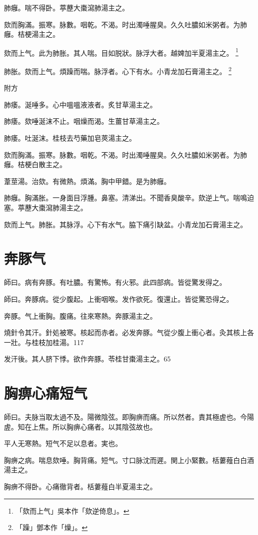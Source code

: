 \documentclass[12pt,twoside,UTF8,b5paper]{ctexbook}
\begin{document}
肺癰。喘不得卧。葶藶大棗瀉肺湯主之。

欬而胸滿。振寒。脉數。咽乾。不渴。时出濁唾腥臭。久久吐膿如米粥者。为肺癰。桔梗湯主之。

欬而上气。此为肺胀。其人喘。目如脱狀。脉浮大者。越婢加半夏湯主之。
	\footnote{「欬而上气」吳本作「欬逆倚息」。}

肺胀。欬而上气。煩躁而喘。脉浮者。心下有水。小青龙加石膏湯主之。
	\footnote{「躁」鄧本作「燥」。}

附方

肺痿。涎唾多。心中嗢嗢液液者。炙甘草湯主之。

肺痿。欬唾涎沫不止。咽燥而渴。生薑甘草湯主之。

肺痿。吐涎沫。桂枝去芍藥加皂莢湯主之。

欬而胸滿。振寒。脉數。咽乾。不渴。时出濁唾腥臭。久久吐膿如米粥者。为肺癰。桔梗白散主之。

葦莖湯。治欬。有微熱。煩滿。胸中甲錯。是为肺癰。

肺癰。胸滿胀。一身面目浮腫。鼻塞。清涕出。不聞香臭酸辛。欬逆上气。喘鳴迫塞。葶藶大棗瀉肺湯主之。

欬而上气。肺胀。其脉浮。心下有水气。脇下痛引缺盆。小青龙加石膏湯主之。

\chapter{奔豚气}

師曰。病有奔豚。有吐膿。有驚怖。有火邪。此四部病。皆從驚发得之。

師曰。奔豚病。從少腹起。上衝咽喉。发作欲死。復還止。皆從驚恐得之。

奔豚。气上衝胸。腹痛。往來寒熱。奔豚湯主之。

燒針令其汗。針処被寒。核起而赤者。必发奔豚。气從少腹上衝心者。灸其核上各一壯。与桂枝加桂湯。117

发汗後。其人脐下悸。欲作奔豚。苓桂甘棗湯主之。65

\chapter{胸痹心痛短气}

師曰。夫脉当取太過不及。陽微陰弦。即胸痹而痛。所以然者。責其極虗也。今陽虗。知在上焦。所以胸痹心痛者。以其陰弦故也。

平人无寒熱。短气不足以息者。実也。

胸痹之病。喘息欬唾。胸背痛。短气。寸口脉沈而遲。関上小緊數。栝蔞薤白白酒湯主之。

胸痹不得卧。心痛徹背者。栝蔞薤白半夏湯主之。
\end{document}
